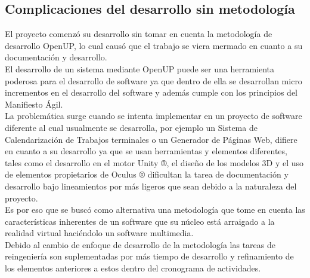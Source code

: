\subsection{Complicaciones del desarrollo sin metodología}
El proyecto comenzó su desarrollo sin tomar en cuenta la metodología de desarrollo OpenUP, lo cual causó que el trabajo se viera mermado en cuanto a su documentación y desarrollo.\\
El desarrollo de un sistema mediante OpenUP puede ser una herramienta poderosa para el desarrollo de software ya que dentro de ella se desarrollan micro incrementos en el desarrollo del software y además cumple con los principios del Manifiesto Ágil\cite{beck2001manifesto}.\\
La problemática surge cuando se intenta implementar en un proyecto de software diferente al cual usualmente se desarrolla, por ejemplo un Sistema de Calendarización de Trabajos terminales o un Generador de Páginas Web, difiere en cuanto a su desarrollo ya que se usan herramientas y elementos diferentes, tales como el desarrollo en el motor Unity ®, el diseño de los modelos 3D y el uso de elementos propietarios de Oculus ® dificultan la tarea de documentación y desarrollo bajo lineamientos por más ligeros que sean debido a la naturaleza del proyecto.\\
Es por eso que se buscó como alternativa una metodología que tome en cuenta las características inherentes de un software que su núcleo está arraigado a la realidad virtual haciéndolo un software multimedia.\\
Debido al cambio de enfoque de desarrollo de la metodología las tareas de reingeniería son suplementadas por más tiempo de desarrollo y refinamiento de los elementos anteriores a estos dentro del cronograma de actividades.\\


